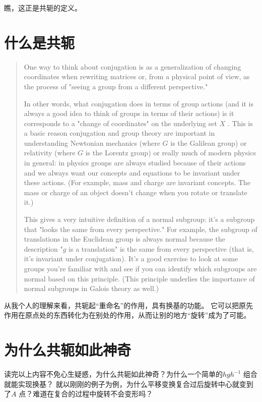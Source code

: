 瞧，这正是共轭的定义。

\section{什么是共轭}

\begin{quotation}
    One way to think about conjugation is as a
    generalization of changing coordinates when rewriting
    matrices or, from a physical point of view, as the
    process of "seeing a group from a different perspective."

    In other words, what conjugation does in terms of group
    actions (and it is always a good idea to think of groups in
    terms of their actions) is it corresponds to a "change of
    coordinates" on the underlying set \(X\)
    . This is a basic reason conjugation and group theory are
    important in understanding Newtonian mechanics (where \(G\)
    is the Galilean group) or relativity (where \(G\)
    is the Lorentz group) or really much of modern physics in
    general: in physics groups are always studied because of
    their actions and we always want our concepts and equations
    to be invariant under these actions. (For example, mass and
        charge are invariant concepts. The mass or charge of an
    object doesn't change when you rotate or translate it.)

    This gives a very intuitive definition of a normal
    subgroup: it's a subgroup that "looks the same from every
    perspective." For example, the subgroup of translations in
    the Euclidean group is always normal because the
    description "\(g\)
    is a translation" is the same from every perspective (that
    is, it's invariant under conjugation). It's a good exercise
    to look at some groups you're familiar with and see if you
    can identify which subgroups are normal based on this
    principle. (This principle underlies the importance of
    normal subgroups in Galois theory as well.)
\end{quotation}

从我个人的理解来看，共轭起``重命名''的作用，具有换基的功能。
它可以把原先作用在原点处的东西转化为在别处的作用，从而让别的地方``旋转''成为了可能。

\section{为什么共轭如此神奇}
读完以上内容不免心生疑惑，为什么共轭如此神奇？为什么一个简单的\(hgh^{-1}\) 组合就能实现换基？
就以刚刚的例子为例，为什么平移变换复合过后旋转中心就变到了\(A\) 点？难道在复合的过程中旋转不会变形吗？

